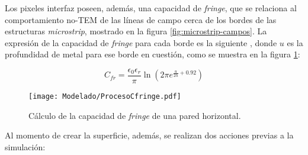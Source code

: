 Los pixeles interfaz poseen, además, una capacidad de \textit{fringe}, que se relaciona al comportamiento no-TEM de las líneas de campo cerca de los bordes de las estructuras \textit{microstrip}, mostrado en la figura \ref{fig:microstrip-campos}. La expresión de la capacidad de \textit{fringe} para cada borde es la siguiente \cite{ThummWiesbeck:CharacteristicImpedance}, donde $u$ es la profundidad de metal para ese borde en cuestión, como se muestra en la figura \ref{fig:profundidad-para-cfringe}:

\begin{equation}
	C_{fr} = \frac{\epsilon_0 \epsilon_r} {\pi} \ln (2 \pi e^{\frac{u}{2 h} + 0.92})
\end{equation}

\begin{figure}[h]
	\centering
	\texttt{[image: Modelado/ProcesoCfringe.pdf]}
	\caption{Cálculo de la capacidad de \textit{fringe} de una pared horizontal.}
	\label{fig:profundidad-para-cfringe}
\end{figure}

Al momento de crear la superficie, además, se realizan dos acciones previas a la simulación:

